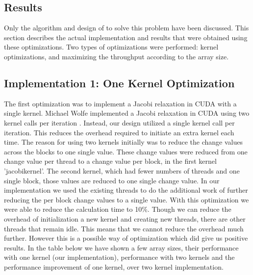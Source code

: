 \documentclass[10pt]{article}
\begin{document}
\begin{multicols}{2}
\section{Results} %
Only the algorithm and design of to solve this problem have been discussed.
This section describes the actual implementation and results that were obtained using these optimizations.
Two types of optimizations were performed: kernel optimizations, and maximizing the throughput according to the array size.
    \subsection{Implementation 1: One Kernel Optimization}
    The first optimization was to implement a Jacobi relaxation in CUDA with a single kernel.
    Michael Wolfe implemented a Jacobi relaxation in CUDA using two kernel calls per iteration \cite{michael}.
    Instead, our design utilized a single kernel call per iteration.
    This reduces the overhead required to initiate an extra kernel each time.
    The reason for using two kernels initially was to reduce the change values across the blocks to one single value.
    These change values were reduced from one change value per thread to a change value per block, in the first kernel 'jacobikernel'.
    The second kernel, which had fewer numbers of threads and one single block, those values are reduced to one single change value.
    In our implementation we used the existing threads to do the additional work of further reducing the per block change values to a single value.
    With this optimization we were able to reduce the calculation time to 10\%.
    Though we can reduce the overhead of initialization a new kernel and creating new threads, there are other threads that remain idle.
    This means that we cannot reduce the overhead much further.
    However this is a possible way of optimization which did give us positive results.
    In the table below we have shown a few array sizes, their performance with one kernel (our implementation), performance with two kernels \cite{michael} and the performance improvement of one kernel, over two kernel implementation.


\end{multicols}
\end{document}
